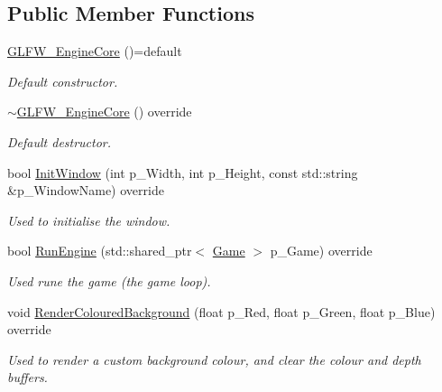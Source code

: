 \subsection*{Public Member Functions}
\begin{DoxyCompactItemize}
\item 
\mbox{\label{class_g_l_f_w___engine_core_a22586aa58b45fa02ed19c4f99a4d51dd}} 
\mbox{\hyperlink{class_g_l_f_w___engine_core_a22586aa58b45fa02ed19c4f99a4d51dd}{G\+L\+F\+W\+\_\+\+Engine\+Core}} ()=default
\begin{DoxyCompactList}\small\item\em Default constructor. \end{DoxyCompactList}\item 
\mbox{\label{class_g_l_f_w___engine_core_adf17916892982f1103140b22dc1b37be}} 
\mbox{\hyperlink{class_g_l_f_w___engine_core_adf17916892982f1103140b22dc1b37be}{$\sim$\+G\+L\+F\+W\+\_\+\+Engine\+Core}} () override
\begin{DoxyCompactList}\small\item\em Default destructor. \end{DoxyCompactList}\item 
bool \mbox{\hyperlink{class_g_l_f_w___engine_core_a5854445153ce1b08ddafc47e1a5f2b23}{Init\+Window}} (int p\+\_\+\+Width, int p\+\_\+\+Height, const std\+::string \&p\+\_\+\+Window\+Name) override
\begin{DoxyCompactList}\small\item\em Used to initialise the window. \end{DoxyCompactList}\item 
bool \mbox{\hyperlink{class_g_l_f_w___engine_core_af96a0fc6059fbb736d4f99697e791122}{Run\+Engine}} (std\+::shared\+\_\+ptr$<$ \mbox{\hyperlink{class_game}{Game}} $>$ p\+\_\+\+Game) override
\begin{DoxyCompactList}\small\item\em Used rune the game (the game loop). \end{DoxyCompactList}\item 
void \mbox{\hyperlink{class_g_l_f_w___engine_core_ab4a942f593d2cc82494897d1fc922aa2}{Render\+Coloured\+Background}} (float p\+\_\+\+Red, float p\+\_\+\+Green, float p\+\_\+\+Blue) override
\begin{DoxyCompactList}\small\item\em Used to render a custom background colour, and clear the colour and depth buffers. \end{DoxyCompactList}\item 

\end{DoxyCompactItemize}
